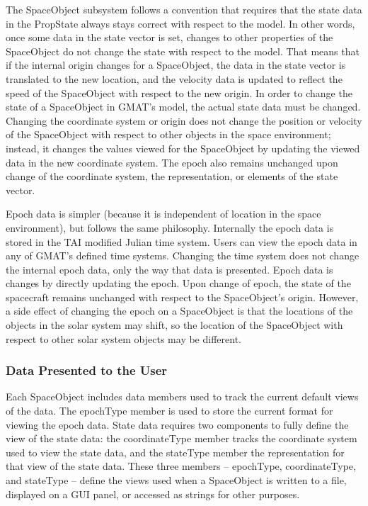 The SpaceObject subsystem follows a convention that requires that the state data in the PropState
always stays correct with respect to the model.  In other words, once some data in the state vector
is set, changes to other properties of the SpaceObject do not change the state with respect to the
model.  That means that if the internal origin changes for a SpaceObject, the data in the state
vector is translated to the new location, and the velocity data is updated to reflect the speed of
the SpaceObject with respect to the new origin.  In order to change the state of a SpaceObject in
GMAT's model, the actual state data must be changed.  Changing the coordinate system or origin does
not change the position or velocity of the SpaceObject with respect to other objects in the space
environment; instead, it changes the values viewed for the SpaceObject by updating the viewed data
in the new coordinate system.  The epoch also remains unchanged upon change of the coordinate
system, the representation, or elements of the state vector.

Epoch data is simpler (because it is independent of location in the space environment), but follows
the same philosophy.  Internally the epoch data is stored in the TAI modified Julian time system.
Users can view the epoch data in any of GMAT's defined time systems.  Changing the time system does
not change the internal epoch data, only the way that data is presented.  Epoch data is changes by
directly updating the epoch.  Upon change of epoch, the state of the spacecraft remains unchanged
with respect to the SpaceObject's origin.  However, a side effect of changing the epoch on a
SpaceObject is that the locations of the objects in the solar system may shift, so the location of
the SpaceObject with respect to other solar system objects may be different.

\subsubsection{Data Presented to the User}

Each SpaceObject includes data members used to track the current default views of the data.  The
epochType member is used to store the current format for viewing the epoch data.  State data
requires two components to fully define the view of the state data: the coordinateType member tracks
the coordinate system used to view the state data, and the stateType member the representation for
that view of the state data.  These three members -- epochType, coordinateType, and stateType --
define the views used when a SpaceObject is written to a file, displayed on a GUI panel, or accessed
as strings for other purposes.

